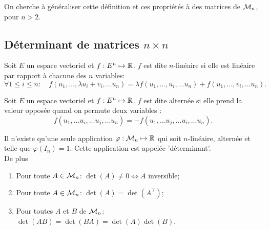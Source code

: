 \bigskip
On cherche à généraliser cette définition et ces propriétés à des matrices de $\mathcal{M}_n$, pour $n > 2$.

\subsection{Déterminant de matrices $n \times n$} 

\begin{definition} \label{def:applicationNLineaire}
  Soit $E$ un espace vectoriel et $f: E^n \mapsto \mathbb{R}$. $f$ est dite $n$-linéaire si elle est linéaire par rapport à chacune des $n$ variables:
  $$
  \forall 1 \leq i \leq n: \quad
  f(u_1, \dots, \lambda u_i + v_i, \dots u_n) = \lambda f(u_1, \dots, u_i, \dots u_n) + f(u_1, \dots, v_i, \dots u_n).
  $$
\end{definition}

\begin{definition} \label{def:applicationAlternee}
  Soit $E$ un espace vectoriel et $f: E^n \mapsto \mathbb{R}$. $f$ est dite alternée si elle prend la valeur opposée quand on permute deux variables : 
  $$
  f(u_1, \dots u_i, \dots u_j, \dots u_n)
  =
  - f(u_1, \dots u_j, \dots u_i, \dots u_n).
  $$
\end{definition}

\begin{theorem} \label{thm:uniciteDeterminant}
  Il n'existe qu'une seule application $\varphi: \mathcal{M}_n \mapsto \mathbb{R}$ qui soit $n$-linéaire, alternée et telle que $\varphi(I_n) = 1$. Cette application est appelée 'déterminant'. \\
  De plus
  \begin{enumerate}[($a$)]
   \item Pour toute $A \in \mathcal{M}_n$: $\det(A) \neq 0 \Leftrightarrow A$ inversible;
   \item Pour toute $A \in \mathcal{M}_n$: $\det(A) = \det(A^\top)$;
   \item Pour toutes $A$ et $B$ de $\mathcal{M}_n$: $\det(A B) = \det(B A) = \det(A) \det(B)$.
  \end{enumerate}
\end{theorem}

